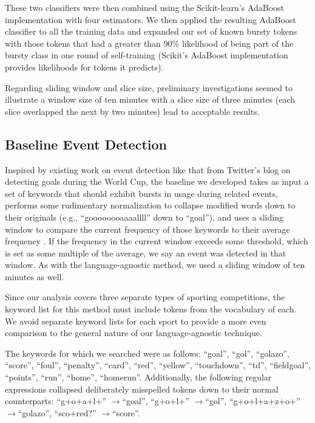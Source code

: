 \documentclass{acm_proc_article-sp}
\begin{document}
These two classifiers were then combined using the Scikit-learn's AdaBoost implementation with four estimators.
We then applied the resulting AdaBoost classifier to all the training data and expanded our set of known bursty tokens with those tokens that had a greater than 90\% likelihood of being part of the bursty class in one round of self-training (Scikit's AdaBoost implementation provides likelihoods for tokens it predicts).

Regarding sliding window and slice size, preliminary investigations seemed to illustrate a window size of ten minutes with a slice size of three minutes (each slice overlapped the next by two minutes) lead to acceptable results.

\subsection{Baseline Event Detection}

Inspired by existing work on event detection like that from Twitter's blog on detecting goals during the World Cup, the baseline we developed takes as input a set of keywords that should exhibit bursts in usage during related events, performs some rudimentary normalization to collapse modified words down to their originals (e.g., ``goooooooaaaallll'' down to ``goal''), and uses a sliding window to compare the current frequency of those keywords to their average frequency \cite{Cipriani2014}.
If the frequency in the current window exceeds some threshold, which is set as some multiple of the average, we say an event was detected in that window.
As with the language-agnostic method, we used a sliding window of ten minutes as well.

Since our analysis covers three separate types of sporting competitions, the keyword list for this method must include tokens from the vocabulary of each. 
We avoid separate keyword lists for each sport to provide a more even comparison to the general nature of our language-agnostic technique.

The keywords for which we searched were as follows: ``goal'', ``gol'', ``golazo'', ``score'', ``foul'', ``penalty'', ``card'', ``red'', ``yellow'', ``touchdown'', ``td'', ``fieldgoal'', ``points'', ``run'', ``home'', ``homerun''.
Additionally, the following regular expressions collapsed deliberately misspelled tokens down to their normal counterparts: ``g+o+a+l+'' $\rightarrow$``goal'', ``g+o+l+'' $\rightarrow$``gol'', ``g+o+l+a+z+o+'' $\rightarrow$``golazo'', ``sco+red?'' $\rightarrow$``score''.
\end{document}
